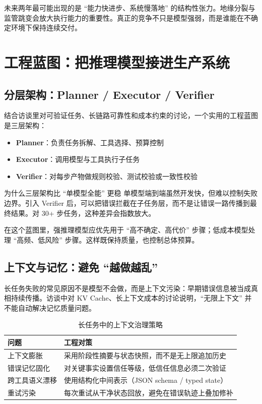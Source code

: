 \documentclass[a4paper]{article}
\begin{document}
未来两年最可能出现的是 ``能力快进步、系统慢落地'' 的结构性张力。地缘分裂与监管跳变会放大执行能力的重要性。真正的竞争不只是模型强弱，而是谁能在不确定环境下保持连续交付。

\section{工程蓝图：把推理模型接进生产系统}

\subsection{分层架构：Planner / Executor / Verifier}

结合访谈里对可验证任务、长链路可靠性和成本约束的讨论，一个实用的工程蓝图是三层架构：
\begin{itemize}
    \item \textbf{Planner}：负责任务拆解、工具选择、预算控制
    \item \textbf{Executor}：调用模型与工具执行子任务
    \item \textbf{Verifier}：对每步产物做规则校验、测试校验或一致性校验
\end{itemize}

\begin{knowledgebox}{为什么三层架构比 ``单模型全能'' 更稳}
单模型端到端虽然开发快，但难以控制失败边界。引入 Verifier 后，可以把错误拦截在子任务层，而不是让错误一路传播到最终结果。对 30+ 步任务，这种差异会指数放大。
\end{knowledgebox}

在这个蓝图里，强推理模型应优先用于 ``高不确定、高代价'' 步骤；低成本模型处理 ``高频、低风险'' 步骤。这样既保持质量，也控制总体预算。

\subsection{上下文与记忆：避免 ``越做越乱''}

长任务失败的常见原因不是模型不会做，而是上下文污染：早期错误信息被当成真相持续传播。访谈中对 KV Cache、长上下文成本的讨论说明，``无限上下文'' 并不能自动解决记忆质量问题。

\begin{table}[H]
\centering
\begin{tabular}{lp{8.7cm}}
\toprule
\textbf{问题} & \textbf{工程对策} \\
\midrule
上下文膨胀 & 采用阶段性摘要与状态快照，而不是无上限追加历史 \\
错误记忆固化 & 对关键事实设置信任等级，低信任信息必须二次验证 \\
跨工具语义漂移 & 使用结构化中间表示（JSON schema / typed state） \\
重试污染 & 每次重试从干净状态回放，避免在错误轨迹上叠加修补 \\
\bottomrule
\end{tabular}
\caption{长任务中的上下文治理策略}
\end{table}
\end{document}
